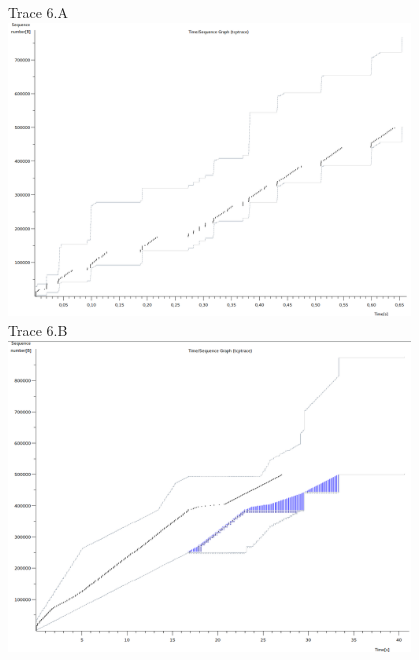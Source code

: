 \centering
Trace 6.A\\
\includegraphics[width=0.8\textwidth]{images/tcptraceA.png}\\
Trace 6.B\\
\includegraphics[width=0.8\textwidth]{images/tcptraceB.png}

